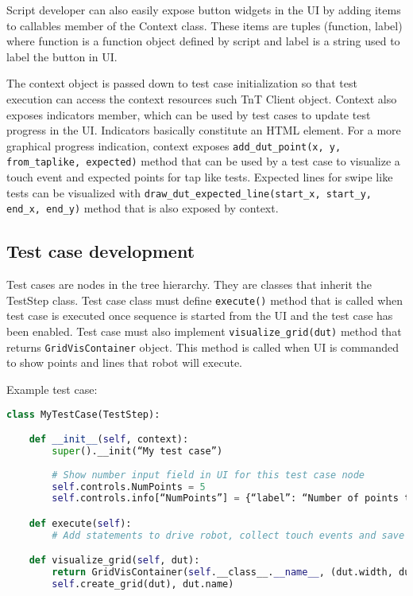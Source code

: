 Script developer can also easily expose button widgets in the UI by adding items to callables member of the Context class. These items are tuples (function, label) where function is a function object defined by script and label is a string used to label the button in UI.

The context object is passed down to test case initialization so that test execution can access the context resources such TnT Client object. Context also exposes indicators member, which can be used by test cases to update test progress in the UI. Indicators basically constitute an HTML element. For a more graphical progress indication, context exposes \texttt{add\_dut\_point(x, y, from\_taplike, expected)} method that can be used by a test case to visualize a touch event and expected points for tap like tests. Expected lines for swipe like tests can be visualized with \texttt{draw\_dut\_expected\_line(start\_x, start\_y, end\_x, end\_y)} method that is also exposed by context.

\subsection{Test case development}

Test cases are nodes in the tree hierarchy. They are classes that inherit the TestStep class. Test case class must define \texttt{execute()} method that is called when test case is executed once sequence is started from the UI and the test case has been enabled. Test case must also implement \texttt{visualize\_grid(dut)} method that returns \texttt{GridVisContainer} object. This method is called when UI is commanded to show points and lines that robot will execute.

Example test case:

\begin{lstlisting}[language=Python]
class MyTestCase(TestStep):

	def __init__(self, context):
		super().__init(“My test case”)
		
		# Show number input field in UI for this test case node
		self.controls.NumPoints = 5
		self.controls.info[“NumPoints”] = {“label”: “Number of points to tap”}

	def execute(self):
		# Add statements to drive robot, collect touch events and save data

	def visualize_grid(self, dut):
		return GridVisContainer(self.__class__.__name__, (dut.width, dut.height), 
		self.create_grid(dut), dut.name)
\end{lstlisting}

